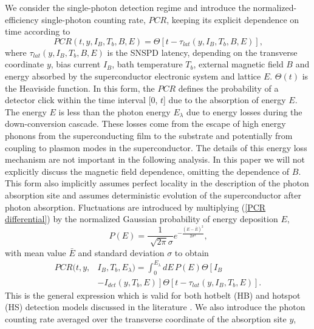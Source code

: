 \documentclass[%
reprint,
 amsmath,amssymb,
aps,
pra,
]{revtex4-1}
\begin{document}
\quad We consider the single-photon detection regime and introduce the normalized-efficiency single-photon counting rate, \(PCR\), keeping its explicit dependence on time according to
\begin{equation}\label{PCR differential}
PCR(t,y,I_B,T_b,B,E)=\Theta\left[t- \tau_{lat}(y,I_B,T_b,B,E)\right]\text{,}
\end{equation}
where \(\tau_{lat}(y,I_B,T_b,B,E)\) is the SNSPD latency, depending on the transverse coordinate \(y\), bias current \(I_B\), bath temperature \(T_b\), external magnetic field \(B\) and energy absorbed by the superconductor electronic system and lattice \(E\). \(\Theta(t)\) is the Heaviside function. In this form, the \(PCR\) defines the probability of a detector click within the time interval [0, \(t\)] due to the absorption of energy \(E\). The energy \(E\) is less than the photon energy \(E_\lambda\) due to energy losses during the down-conversion cascade. These losses come from the escape of high energy phonons from the superconducting film to the substrate and potentially from coupling to plasmon modes in the superconductor. The details of this energy loss mechanism are not important in the following analysis. In this paper we will not explicitly discuss the magnetic field dependence, omitting the dependence of \(B\). This form also implicitly assumes perfect locality in the description of the photon absorption site and assumes deterministic evolution of the superconductor after photon absorption. Fluctuations are introduced by multiplying (\ref{PCR differential}) by the normalized Gaussian probability of energy deposition \(E\),
\begin{equation}\label{Gaussian}
P(E)=\frac{1}{\sqrt[]{2\pi}\sigma}e^{-\frac{\left(E-\bar{E}\right)^2}{2{\sigma}^2}}\text{,}
\end{equation}
with mean value \(\bar{E}\) and standard deviation \(\sigma\) to obtain
\begin{equation}\label{PCR general}
\begin{aligned}
PCR(t,y,&I_B,T_b,E_\lambda)={}\int_0^{E_\lambda}dE\, P(E)\Theta\left[I_B \right.\\
&\left.-I_{det}(y,T_b,E)\right]\Theta\left[t-\tau_{lat}( y,I_B,T_b,E)\right] \text{.}
\end{aligned}
\end{equation}
This is the general expression which is valid for both hotbelt (HB) and hotspot (HS) detection models discussed in the literature \cite{marsili_hotspot_2016,bulaevskii_vortex-assisted_2012,zotova_intrinsic_2014,kozorezov_quasiparticle_2015,kozorezov_fano_2017,vodolazov_single-photon_2017}.  We also introduce the photon counting rate averaged over the transverse coordinate of the absorption site $y$, 
\end{document}
